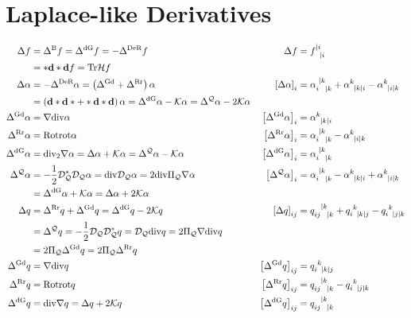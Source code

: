 \documentclass[a4paper,10pt]{scrartcl}
\newcommand{\gauss}{\mathcal{K}}
\newcommand{\exd}{\mathbf{d}}
\newcommand{\Tr}{\mathrm{Tr}}
\newcommand{\rot}{\mathrm{rot}}
\renewcommand{\div}{\mathrm{div}}
\newcommand{\Rot}{\mathrm{Rot}}
\newcommand{\dq}{\mathcal{D}_{\mathcal{Q}}}
\newcommand{\hess}{\mathcal{H}}
\newcommand{\laplace}[1]{\Delta^{#1}}
\newcommand{\lderham}{\laplace{\textup{DeR}}}
\newcommand{\ldivgrad}{\laplace{\textup{dG}}}
\newcommand{\lgraddiv}{\laplace{\textup{Gd}}}
\newcommand{\lrotrot}{\laplace{\textup{Rr}}}
\newcommand{\lbeltrami}{\laplace{\textup{B}}}
\newcommand{\lQ}{\laplace{\mathcal{Q}}}
\newcommand{\piQ}{\Pi_{\mathcal{Q}}}
\begin{document}
\section{Laplace-like Derivatives}
\begin{align*}
  \Delta f &= \lbeltrami f = \ldivgrad f= -\lderham f
        &\Delta f &= \tensor{f}{^{|i}_{|i}} \\
           &= *\exd*\exd f = \Tr\hess f\\
  \Delta\alpha &= -\lderham\alpha = \left( \lgraddiv + \lrotrot \right)\alpha 
        &\left[ \Delta\alpha \right]_{i} &= \tensor{\alpha}{_{i}^{|k}_{|k}} + \tensor{\alpha}{^{k}_{|k|i}} - \tensor{\alpha}{^{k}_{|i|k}}\\
               &= \left( \exd*\exd* + *\exd*\exd \right)\alpha
                = \ldivgrad\alpha - \gauss\alpha = \lQ\alpha - 2\gauss\alpha \\
  \lgraddiv\alpha &= \nabla\div\alpha
        &\left[ \lgraddiv\alpha \right]_{i} &= \tensor{\alpha}{^{k}_{|k|i}} \\
  \lrotrot\alpha &= \Rot\rot\alpha
        &\left[ \lrotrot\alpha \right]_{i} &= \tensor{\alpha}{_{i}^{|k}_{|k}} - \tensor{\alpha}{^{k}_{|i|k}}\\
  \ldivgrad\alpha &= \div_{2}\nabla\alpha  = \Delta\alpha + \gauss\alpha = \lQ\alpha - \gauss\alpha
        &\left[ \ldivgrad\alpha \right]_{i} &= \tensor{\alpha}{_{i}^{|k}_{|k}}\\
  \lQ\alpha &= -\frac{1}{2}\dq^{*}\dq\alpha = \div\dq\alpha = 2\div\piQ\nabla\alpha
        &\left[ \lQ\alpha \right]_{i} &=\tensor{\alpha}{_{i}^{|k}_{|k}} - \tensor{\alpha}{^{k}_{|k|i}} + \tensor{\alpha}{^{k}_{|i|k}}\\
            &= \ldivgrad\alpha + \gauss\alpha = \Delta\alpha + 2\gauss\alpha \\
  \Delta q &= \lrotrot q + \lgraddiv q = \ldivgrad q -2\gauss q 
        &\left[ \Delta q \right]_{ij} &= \tensor{q}{_{ij}^{|k}_{|k}} + \tensor{q}{_{i}^{k}_{|k|j}} - \tensor{q}{_{i}^{k}_{|j|k}}\\
           &= \lQ q = -\frac{1}{2}\dq\dq^{*} q = \dq\div q = 2\piQ\nabla\div q \\
           &=  2\piQ\lgraddiv q = 2\piQ\lrotrot q\\
  \lgraddiv q &= \nabla\div q 
           & \left[ \lgraddiv q \right]_{ij} &= \tensor{q}{_{i}^{k}_{|k|j}} \\
  \lrotrot q &= \Rot\rot q
           &\left[ \lrotrot q \right]_{ij} &= \tensor{q}{_{ij}^{|k}_{|k}} - \tensor{q}{_{i}^{k}_{|j|k}}\\
  \ldivgrad q &= \div\nabla q = \Delta q + 2\gauss q
           & \left[ \ldivgrad q \right]_{ij} &= \tensor{q}{_{ij}^{|k}_{|k}}
\end{align*}
\end{document}
